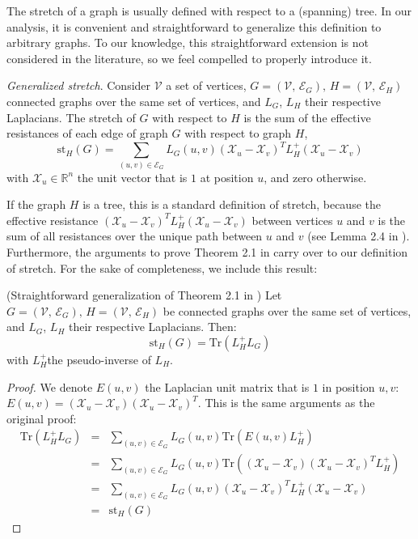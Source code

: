 The stretch of a graph is usually defined with respect to a (spanning)
tree. In our analysis, it is convenient and straightforward to generalize
this definition to arbitrary graphs. To our knowledge, this straightforward
extension is not considered in the literature, so we feel compelled
to properly introduce it. 
\begin{definition}
\emph{Generalized stretch}.\label{Generalized-stretch} Consider $\mathcal{V}$
a set of vertices, $G=\left(\mathcal{V},\,\mathcal{E}_{G}\right),\, H=\left(\mathcal{V},\,\mathcal{E}_{H}\right)$
connected graphs over the same set of vertices, and $L_{G}$, $L_{H}$
their respective Laplacians. The stretch of $G$ with respect to $H$
is the sum of the effective resistances of each edge of graph $G$
with respect to graph $H$, 
\[
\text{st}_{H}\left(G\right)=\sum_{\left(u,v\right)\in\mathcal{E}_{G}}L_{G}\left(u,v\right)\left(\mathcal{X}_{u}-\mathcal{X}_{v}\right)^{T}L_{H}^{+}\left(\mathcal{X}_{u}-\mathcal{X}_{v}\right)
\]
with $\mathcal{X}_{u}\in\mathbb{R}^{n}$ the unit vector that is $1$
at position $u$, and zero otherwise. 
\end{definition}
If the graph $H$ is a tree, this is a standard definition of stretch,
because the effective resistance $\left(\mathcal{X}_{u}-\mathcal{X}_{v}\right)^{T}L_{H}^{+}\left(\mathcal{X}_{u}-\mathcal{X}_{v}\right)$
between vertices $u$ and $v$ is the sum of all resistances over
the unique path between $u$ and $v$ (see Lemma 2.4 in \cite{Spielman2009b}).
Furthermore, the arguments to prove Theorem 2.1 in \cite{Spielman2009b}
carry over to our definition of stretch. For the sake of completeness,
we include this result: 
\begin{lemma}
\label{lem:stretch-trace}(Straightforward generalization of Theorem
2.1 in \cite{Spielman2009b}) Let $G=\left(\mathcal{V},\,\mathcal{E}_{G}\right),\, H=\left(\mathcal{V},\,\mathcal{E}_{H}\right)$
be connected graphs over the same set of vertices, and $L_{G}$, $L_{H}$
their respective Laplacians. Then: 
\[
\text{st}_{H}\left(G\right)=\text{Tr}\left(L_{H}^{+}L_{G}\right)
\]
with $L_{H}^{+}$the pseudo-inverse of $L_{H}$.\end{lemma}
\begin{proof}
We denote $E\left(u,v\right)$ the Laplacian unit matrix that is $1$
in position $u,v$: $E\left(u,v\right)=\left(\mathcal{X}_{u}-\mathcal{X}_{v}\right)\left(\mathcal{X}_{u}-\mathcal{X}_{v}\right)^{T}$.
This is the same arguments as the original proof: 
\begin{eqnarray*}
\text{Tr}\left(L_{H}^{+}L_{G}\right) & = & \sum_{\left(u,v\right)\in\mathcal{E}_{G}}L_{G}\left(u,v\right)\text{Tr}\left(E\left(u,v\right)L_{H}^{+}\right)\\
 & = & \sum_{\left(u,v\right)\in\mathcal{E}_{G}}L_{G}\left(u,v\right)\text{Tr}\left(\left(\mathcal{X}_{u}-\mathcal{X}_{v}\right)\left(\mathcal{X}_{u}-\mathcal{X}_{v}\right)^{T}L_{H}^{+}\right)\\
 & = & \sum_{\left(u,v\right)\in\mathcal{E}_{G}}L_{G}\left(u,v\right)\left(\mathcal{X}_{u}-\mathcal{X}_{v}\right)^{T}L_{H}^{+}\left(\mathcal{X}_{u}-\mathcal{X}_{v}\right)\\
 & = & \text{st}_{H}\left(G\right)
\end{eqnarray*}

\end{proof}
